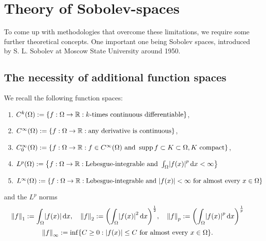 \section{Theory of Sobolev-spaces}

To come up with methodologies that overcome these limitations, we require some further theoretical concepts.
One important one being Sobolev spaces, introduced by S. L. Sobolev at Moscow State University around 1950.


\subsection{The necessity of additional function spaces}

\begin{definition}
	We recall the following function spaces:
	\begin{enumerate}
		\item \(C^k\parentheses*{\Omega} := \braces*{f: \Omega \to \R : k\text{-times continuous differentiable}}\),
		\item \(C^\infty\parentheses*{\Omega} := \braces*{f: \Omega \to \R : \text{any derivative is continuous}}\),
		\item \(C_0^\infty\parentheses*{\Omega} := \braces*{f: \Omega \to \R : f \in C^\infty\parentheses*{\Omega}\text{ and }\supp f \subset K \subset \Omega, K\text{ compact}}\),
		\item \(L^p\parentheses*{\Omega} := \braces*{f: \Omega \to \R : \text{Lebesgue-integrable and }\int_\Omega \absolute*{f\parentheses*{x}}^p \d x < \infty}\)
		\item \(L^\infty\parentheses*{\Omega} := \braces*{f: \Omega \to \R : \text{Lebesgue-integrable and }\absolute*{f\parentheses*{x}} < \infty\text{ for almost every }x \in \Omega}\)
	\end{enumerate}
	and the \(L^p\) norms
	\[
		\norm*{f}_1 := \int_\Omega \absolute*{f\parentheses*{x}}\d x, \quad \norm*{f}_2 := \parentheses*{\int_\Omega \absolute*{f\parentheses*{x}}^2 \d x}^{\frac{1}{2}}, \quad \norm*{f}_p := \parentheses*{\int_\Omega \absolute*{f\parentheses*{x}}^p \d x}^{\frac{1}{p}}
	\]
	\[
		\norm*{f}_\infty := \inf\braces*{C \ge 0 : \absolute*{f\parentheses*{x}} \le C\text{ for almost every }x \in \Omega}.
	\]
\end{definition}


